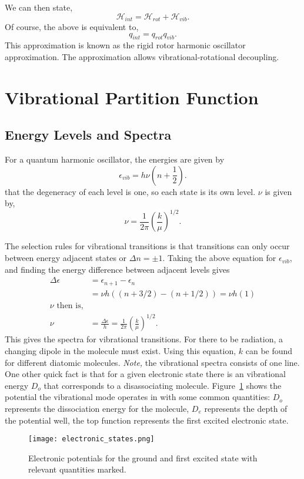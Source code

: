 We can then state,
\begin{equation*}
	\mathcal{H}_{int} = \mathcal{H}_{rot} + \mathcal{H}_{vib}.
\end{equation*}
Of course, the above is equivalent to,
\begin{equation*}
	q_{int} = q_{rot}q_{vib}.
\end{equation*}
This approximation is known as the rigid rotor harmonic oscillator
approximation. The approximation allows vibrational-rotational decoupling.

\section{Vibrational Partition Function}%
\label{sec:diatomicvib}
\subsection{Energy Levels and Spectra}
For a quantum harmonic oscillator, the energies are given by
\begin{equation*}
	\epsilon_{vib} = h\nu(n+ \frac{1}{2}).
\end{equation*}
\note that the degeneracy of each level is one, so each state is its
own level. $\nu$ is given by,
\begin{equation*}
	\nu = \frac{1}{2\pi} \left(\frac{k}{\mu}\right)^{1/2}.
\end{equation*}

The selection rules for vibrational transitions is that transitions can only
occur between energy adjacent states or $\Delta n = \pm 1$. Taking the above
equation for $\epsilon_{vib}$, and finding the energy difference between
adjacent levels gives
\begin{align*}
	\Delta\epsilon &= \epsilon_{n+1} - \epsilon_{n}\\
				   &= \nu h ((n + 3/2) - (n + 1/2)) = \nu h (1)\\
				   \nu\text{ then is,}\\
	\nu &= \frac{\Delta\epsilon}{h} =
	\frac{1}{2\pi}\left(\frac{k}{\mu}\right)^{1/2}.
\end{align*}
This gives the spectra for vibrational transitions. For there to be radiation, a
changing dipole in the molecule must exist. Using this equation, $k$ can be
found for different diatomic molecules. \textit{Note,} the vibrational spectra
consists of one line. One other quick fact is that for a given electronic state
there is an vibrational energy $D_o$ that corresponds to a disassociating
molecule. Figure~\ref{fig:diatomicelectronic} shows the potential the
vibrational mode operates in with some common quantities: $D_o$ represents the
dissociation energy for the molecule, $D_e$ represents the depth of the
potential well, the top function represents the first excited electronic state.
\begin{figure}[htpb]
	\centering
	\texttt{[image: electronic\_states.png]}
	\caption{Electronic potentials for the ground and first excited state with
	relevant quantities marked.}
	\label{fig:diatomicelectronic}
\end{figure}

